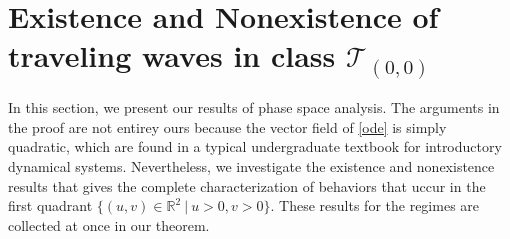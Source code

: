 \documentclass{amsart}
\theoremstyle{definition}
\numberwithin{equation}{section}
\begin{document}
\section{Existence and Nonexistence of traveling waves in class $\mathcal{T}_{(0,0)}$} \label{mainthm}

In this section, we present our results of phase space analysis. The arguments in the proof are not entirey ours because the vector field of \eqref{ode} is simply quadratic, which are found in a typical undergraduate textbook for introductory dynamical systems. Nevertheless, we investigate the existence and nonexistence results that gives the complete characterization of behaviors that uccur in the first quadrant $\{(u,v) \in \mathbb{R}^2 ~|~ u >0, v>0\}$. These results for the regimes are collected at once in our theorem.
\end{document}
